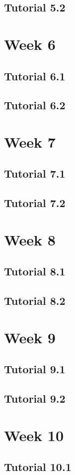 \documentclass{article}
\begin{document}
\begin{multicols}{2}
\subsection{Tutorial 5.2}
\section{Week 6}
\subsection{Tutorial 6.1}
\subsection{Tutorial 6.2}
\section{Week 7}
\subsection{Tutorial 7.1}
\subsection{Tutorial 7.2}
\section{Week 8}
\subsection{Tutorial 8.1}
\subsection{Tutorial 8.2}
\section{Week 9}
\subsection{Tutorial 9.1}
\subsection{Tutorial 9.2}
\section{Week 10}
\subsection{Tutorial 10.1}

\end{multicols}
\end{document}
